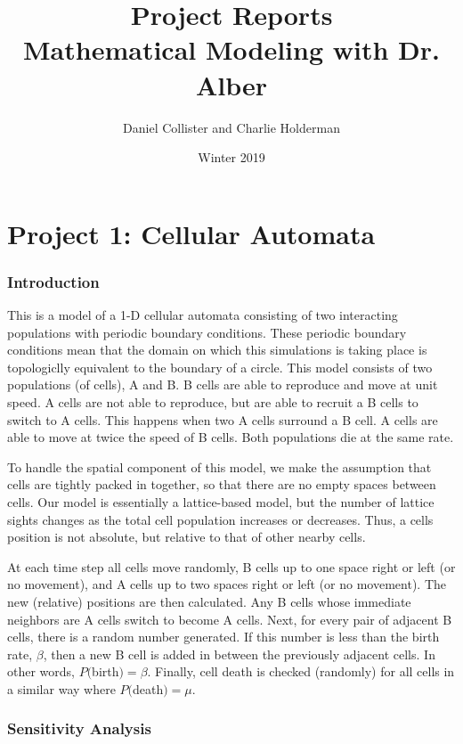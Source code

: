 \documentclass[12pt,letterpaper,cm]{article}
\title{Project Reports\\Mathematical Modeling with Dr. Alber}
\date{Winter 2019}
\author{Daniel Collister and Charlie Holderman}
\renewcommand{\.}{\cdot}
\newcommand{\<}{\langle}
\renewcommand{\>}{\rangle}
\begin{document}
	\maketitle
	
	\part*{Project 1: Cellular Automata}
	
	
	\section*{Introduction}
	
	This is a model of a 1-D cellular automata consisting of two interacting populations with periodic boundary conditions. These periodic boundary conditions mean that the domain on which this simulations is taking place is topologiclly equivalent to the boundary of a circle. This model consists of two populations (of cells), A and B. B cells are able to reproduce and move at unit speed. A cells are not able to reproduce, but are able to recruit a B cells to switch to A cells. This happens when two A cells surround a B cell. A cells are able to move at twice the speed of B cells. Both populations die at the same rate. 
	
	To handle the spatial component of this model, we make the assumption that cells are tightly packed in together, so that there are no empty spaces between cells. Our model is essentially a lattice-based model, but the number of lattice sights changes as the total cell population increases or decreases. Thus, a cells position is not absolute, but relative to that of other nearby cells. 
	
	At each time step all cells move randomly, B cells up to one space right or left (or no movement), and A cells up to two spaces right or left (or no movement). The new (relative) positions are then calculated. Any B cells whose immediate neighbors are A cells switch to become A cells. Next, for every pair of adjacent B cells, there is a random number generated. If this number is less than the birth rate, $\beta$, then a new B cell is added in between the previously adjacent cells. In other words, $P($birth$) = \beta$. Finally, cell death is checked (randomly) for all cells in a similar way where $P($death$) = \mu$.
	

	
	
	
	\section*{Sensitivity Analysis}	
	
\end{document}
